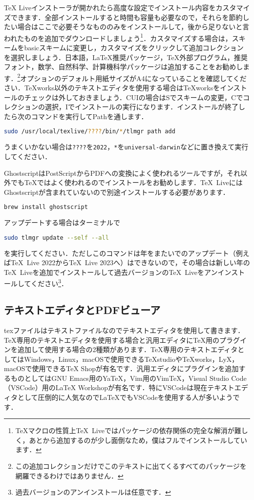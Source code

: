 TeX Liveインストーラが開かれたら高度な設定でインストール内容をカスタマイズできます．全部インストールすると時間も容量も必要なので，それらを節約したい場合はここで必要そうなもののみをインストールして，後から足りないと言われたものを追加でダウンロードしましょう\footnote{\TeX マクロの性質上\TeX\ Liveではパッケージの依存関係の完全な解消が難しく，あとから追加するのが少し面倒なため，僕はフルでインストールしています．}．カスタマイズする場合は，スキームをbasicスキームに変更し，カスタマイズをクリックして追加コレクションを選択しましょう．日本語，LaTeX推奨パッケージ，TeX外部プログラム，推奨フォント，数学、自然科学、計算機科学パッケージは追加することをお勧めします．\footnote{この追加コレクションだけでこのテキストに出てくるすべてのパッケージを網羅できるわけではありません．}オプションのデフォルト用紙サイズがA4になっていることを確認してください．TeXworks以外のテキストエディタを使用する場合はTeXworksをインストールのチェックは外しておきましょう．CUIの場合はSでスキームの変更，Cでコレクションの選択，Iでインストールの実行になります．インストールが終了したら次のコマンドを実行してPathを通します．
\begin{lstlisting}[language=bash]
sudo /usr/local/texlive/????/bin/*/tlmgr path add
\end{lstlisting}
うまくいかない場合は\texttt{????}を\texttt{2022}，\texttt{*}を\texttt{universal-darwin}などに置き換えて実行してください．

GhostscriptはPostScriptからPDFへの変換によく使われるツールですが，それ以外でも\TeX ではよく使われるのでインストールをお勧めします．\TeX\ LiveにはGhostscriptが含まれていないので別途インストールする必要があります．
\begin{lstlisting}[language=bash]
brew install ghostscript
\end{lstlisting}

アップデートする場合はターミナルで
\begin{lstlisting}[language=bash]
sudo tlmgr update --self --all
\end{lstlisting}
を実行してください．ただしこのコマンドは年をまたいでのアップデート（例えば\TeX\ Live 2022から\TeX\ Live 2023へ）はできないので，その場合は新しい年の\TeX\ Liveを追加でインストールして過去バージョンの\TeX\ Liveをアンインストールしてください\footnote{過去バージョンのアンインストールは任意です．}．

\subsection{テキストエディタとPDFビューア}
texファイルはテキストファイルなのでテキストエディタを使用して書きます．\TeX 専用のテキストエディタを使用する場合と汎用エディタに\TeX 用のプラグインを追加して使用する場合の2種類があります．\TeX 専用のテキストエディタとしてはWindows，Linux，macOSで使用できる\TeX studioや\TeX works，LyX，macOSで使用できるTeX Shopが有名です．汎用エディタにプラグインを追加するものとしてはGNU Emacs用のYaTeX，Vim用のVimTeX，Visual Studio Code（VSCode）用のLaTeX Workshopが有名です．特にVSCodeは現在テキストエディタとして圧倒的に人気なので\LaTeX でもVSCodeを使用する人が多いようです．

